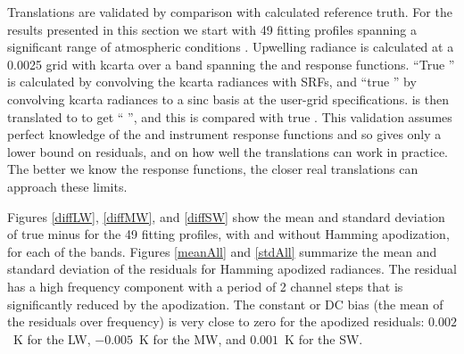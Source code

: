 \documentclass[11pt]{article}
\begin{document}
Translations are validated by comparison with calculated reference
truth.  For the results presented in this section we start with 49
fitting profiles spanning a significant range of atmospheric
conditions \cite{sarta1,sarta2}.  Upwelling radiance is calculated
at a 0.0025 {\wn} grid with kcarta \cite{kcarta1} over a band
spanning the {\airs} and {\cris} response functions.  ``True
{\airs}'' is calculated by convolving the kcarta radiances with
{\airs} SRFs, and ``true {\cris}'' by convolving kcarta radiances to
a sinc basis at the {\cris} user-grid specifications.  {\airs} is
then translated to {\cris} to get ``{\airs} {\cris}'', and this is
compared with true {\cris}.  This validation assumes perfect
knowledge of the {\airs} and {\cris} instrument response functions
and so gives only a lower bound on residuals, and on how well the
translations can work in practice.  The better we know the response
functions, the closer real translations can approach these limits.


Figures \ref{diffLW}, \ref{diffMW}, and \ref{diffSW} show the mean
and standard deviation of true {\cris} minus {\airs} {\cris} for the
49 fitting profiles, with and without Hamming apodization, for each
of the {\cris} bands.  Figures \ref{meanAll} and \ref{stdAll}
summarize the mean and standard deviation of the residuals for
Hamming apodized radiances.  The residual has a high frequency
component with a period of 2 channel steps that is significantly
reduced by the apodization.  The constant or DC bias (the mean of
the residuals over frequency) is very close to zero for the apodized
residuals: $0.002$~K for the LW, $-0.005$~K for the MW, and
$0.001$~K for the SW.

\end{document}

